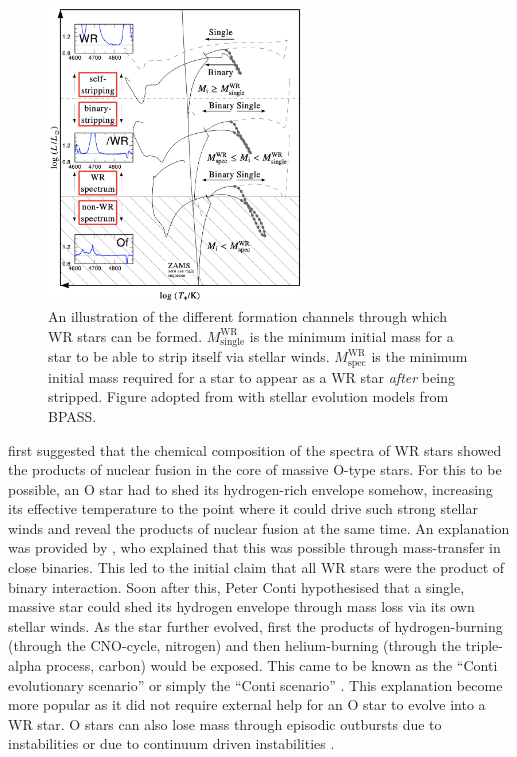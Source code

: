 \begin{figure}
    \centering
    \includegraphics[width=0.6\textwidth]{chapters/introduction/image/FormationChannels.png}
    \caption{An illustration of the different formation channels through which WR stars can be formed. $M^{\textrm{WR}}_{\textrm{single}}$ is the minimum initial mass for a star to be able to strip itself via stellar winds. $M^{\textrm{WR}}_{\textrm{spec}}$ is the minimum initial mass required for a star to appear as a WR star \textit{after} being stripped. Figure adopted from \citet{shenar_why_2020} with stellar evolution models from BPASS.}
    \label{fig:formation_wr}
\end{figure}

\citet{gamow_wc_1943} first suggested that the chemical composition of the spectra of WR stars showed the products of nuclear fusion in the core of massive O-type stars. For this to be possible, an O star had to shed its hydrogen-rich envelope somehow, increasing its effective temperature to the point where it could drive such strong stellar winds and reveal the products of nuclear fusion at the same time. An explanation was provided by \citet{paczynski_evolution_1967}, who explained that this was possible through mass-transfer in close binaries. This led to the initial claim that all WR stars were the product of binary interaction. Soon after this, Peter Conti hypothesised that a single, massive star could shed its hydrogen envelope through mass loss via its own stellar winds. As the star further evolved, first the products of hydrogen-burning (through the CNO-cycle, nitrogen) and then helium-burning (through the triple-alpha process, carbon) would be exposed. This came to be known as the ``Conti evolutionary scenario'' or simply the ``Conti scenario'' \citep{1976Conti}. This explanation become more popular as it did not require external help for an O star to evolve into a WR star. O stars can also lose mass through episodic outbursts due to instabilities \citep[e.g.][]{langer_towards_1994} or due to continuum driven instabilities \citep{smith_role_2006}.

